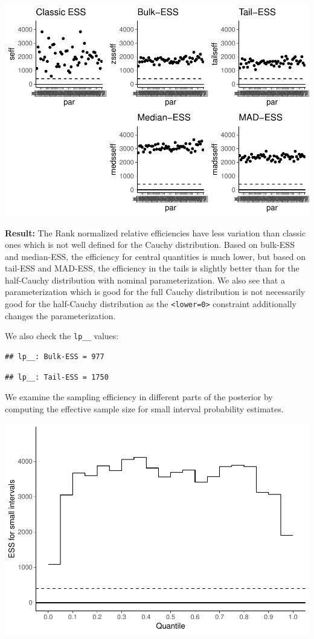\documentclass[american,]{article}
\begin{document}
\includegraphics{graphics/ess-fit-half-reparam-1.pdf}

\textbf{Result:} The Rank normalized relative efficiencies have less
variation than classic ones which is not well defined for the Cauchy
distribution. Based on bulk-ESS and median-ESS, the efficiency for
central quantities is much lower, but based on tail-ESS and MAD-ESS, the
efficiency in the tails is slightly better than for the half-Cauchy
distribution with nominal parameterization. We also see that a
parameterization which is good for the full Cauchy distribution is not
necessarily good for the half-Cauchy distribution as the
\texttt{\textless{}lower=0\textgreater{}} constraint additionally
changes the parameterization.

We also check the \texttt{lp\_\_} values:

\begin{verbatim}
## lp__: Bulk-ESS = 977
\end{verbatim}

\begin{verbatim}
## lp__: Tail-ESS = 1750
\end{verbatim}

We examine the sampling efficiency in different parts of the posterior
by computing the effective sample size for small interval probability
estimates.

\includegraphics{graphics/local-ess-fit-half-reparam-1.pdf}
\end{document}
